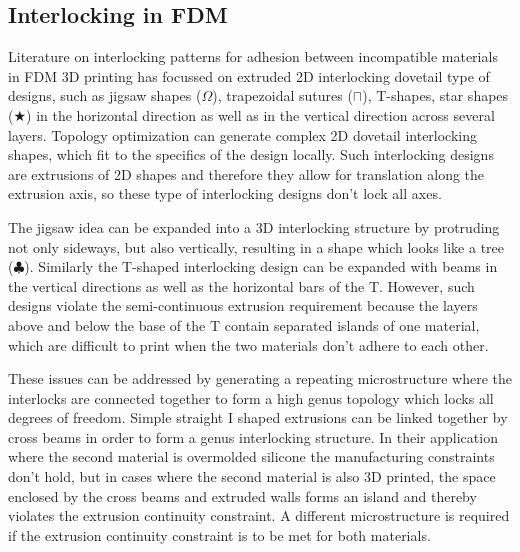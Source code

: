 \subsection{Interlocking in FDM}

Literature on interlocking patterns for adhesion between incompatible materials in FDM 3D printing has focussed on extruded 2D interlocking dovetail type of designs,
such as jigsaw shapes ($\Omega$)\cite{malik2017}, trapezoidal sutures ($\sqcap$)\cite{Li2013}, T-shapes\cite{Ribeiro2019}, star shapes ($\bigstar$)\cite{Wang2021} in the horizontal direction
as well as in the vertical direction across several layers\cite{debora2020}.
Topology optimization can generate complex 2D dovetail interlocking shapes, which fit to the specifics of the design locally\cite{aharoni2021}.
Such interlocking designs are extrusions of 2D shapes and therefore they allow for translation along the extrusion axis, so these type of interlocking designs don't lock all axes.

The jigsaw idea can be expanded into a 3D interlocking structure by protruding not only sideways, but also vertically, resulting in a shape which looks like a tree ($\clubsuit$)\cite{gouker2006manufacturing}.
Similarly the T-shaped interlocking design can be expanded with beams in the vertical directions as well as the horizontal bars of the T.
However, such designs violate the semi-continuous extrusion requirement because the layers above and below the base of the T contain separated islands of one material, 
which are difficult to print when the two materials don't adhere to each other.

These issues can be addressed by generating a repeating microstructure where the interlocks are connected together to form a high genus topology which locks all degrees of freedom.
Simple straight I shaped extrusions can be linked together by cross beams in order to form a genus interlocking structure\cite{Rossing2020}.
In their application where the second material is overmolded silicone the manufacturing constraints don't hold,
but in cases where the second material is also 3D printed, the space enclosed by the cross beams and extruded walls forms an island and thereby violates the extrusion continuity constraint.
A different microstructure is required if the extrusion continuity constraint is to be met for both materials.



